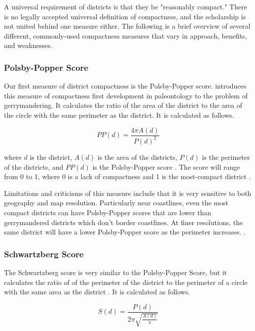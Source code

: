 A universal requirement of districts is that they be "reasonably compact." There is no legally accepted universal definition of compactness, and the scholarship is not united behind one measure either. The following is a brief overview of several different, commonly-used compactness measures that vary in approach, benefits, and weaknesses. 

\subsubsection{Polsby-Popper Score}

Our first measure of district compactness is the Polsby-Popper score. \textcite{polsby1991} introduces this measure of compactness first development in paleontology to the problem of gerrymandering. It calculates the ratio of the area of the district to the area of the circle with the same perimeter as the district. It is calculated as follows.

\begin{equation}
    PP(d) = \frac{4 \pi A(d)}{P(d)^2}
\end{equation}

where $d$ is the district, $A(d)$ is the area of the districts, $P(d)$ is the perimeter of the districts, and $PP(d)$ is the Polsby-Popper score \parencite{cox1927,polsby1991}. The score will range from 0 to 1, where 0 is a lack of compactness and 1 is the most-compact district \parencite{polsby1991}.

Limitations and criticisms of this measure include that it is very sensitive to both geography and map resolution. Particularly near coastlines, even the most compact districts can have Polsby-Popper scores that are lower than gerrymandered districts which don't border coastlines. At finer resolutions, the same district will have a lower Polsby-Popper score as the perimeter increases. \parencite[12]{mccartan2020}.

\subsubsection{Schwartzberg Score}

The Schwartzberg score is very similar to the Polsby-Popper Score, but it calculates the ratio of of the perimeter of the district to the perimeter of a circle with the same area as the district \parencite{schwartzberg1966}. It is calculated as follows. 

\begin{equation}
    S(d) = \frac{P(d)}{2 \pi \sqrt{\frac{A(d)}{\pi}}}
\end{equation}


